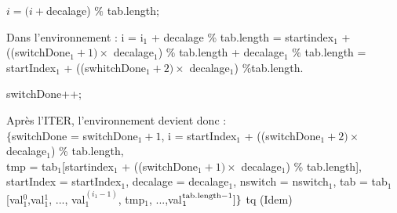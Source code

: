 \begin{center}
  $i = (i+$decalage) $\%$ tab.length;\\
\end{center} 
 
 Dans l'environnement : i = i$_{1}$ + decalage \% tab.length = startindex$_{1}$ + ((switchDone$_{1}+1)\times$ decalage$_{1}$) $\%$ tab.length  + decalage$_{1}$ $\%$ tab.length = startIndex$_{1}$ + ((swhitchDone$_{1}+2)\times$ decalage$_{1}$) $\%$tab.length.\\
 
\begin{center}
switchDone++;\\
\end{center}
 
Après l'ITER, l'environnement devient donc : \\

\noindent$\{$switchDone = switchDone$_{1}+1$, i = startIndex$_{1}$ + ((switchDone$_{1}+2)\times$ decalage$_1$) \% tab.length,\\
tmp = tab$_{1}$[startindex$_{1}$ + ((switchDone$_{1}+1)\times$ decalage$_{1}$) \% tab.length], startIndex = startIndex$_{1}$, decalage = decalage$_{1}$, nswitch = nswitch$_{1}$, tab = tab$_{1}$[val$_{1}^{0}$,val$_{1}^{1}$, ..., val$_{1}^{(i_{1}-1)}$, tmp$_{1}$, ...,val$_{1}^{\mathrm{tab.length}-1}]\}\\$
tq (Idem)\\

